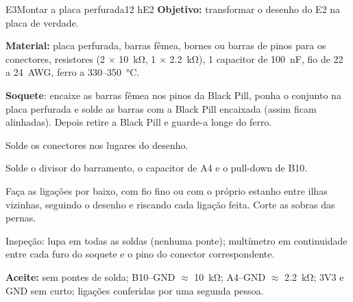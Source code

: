 \documentclass[11pt,a4paper]{article}
\newcommand{\aprox}{\ensuremath{\approx}}
\newcommand{\objetivo}[1]{{\color{azul!70!black}\textbf{Objetivo:} #1}\par\smallskip}
\begin{document}
\begin{tarefa}[ele]{E3}{Montar a placa perfurada}{1}{2 h}{E2}
\objetivo{transformar o desenho do E2 na placa de verdade.}
\textbf{Material:} placa perfurada, barras fêmea, bornes ou barras de pinos para os
conectores, resistores (2 $\times$ \qty{10}{\kilo\ohm}, 1 $\times$ \qty{2,2}{\kilo\ohm}),
1 capacitor de \qty{100}{\nano\farad}, fio de 22 a 24~AWG, ferro a 330--350~°C.
\begin{passos}
  \item \textbf{Soquete}: encaixe as barras fêmea nos pinos da Black Pill, ponha o conjunto
    na placa perfurada e solde as barras com a Black Pill encaixada (assim ficam
    alinhadas). Depois retire a Black Pill e guarde-a longe do ferro.
  \item Solde os conectores nos lugares do desenho.
  \item Solde o divisor do barramento, o capacitor de A4 e o pull-down de B10.
  \item Faça as ligações por baixo, com fio fino ou com o próprio estanho entre ilhas
    vizinhas, seguindo o desenho e riscando cada ligação feita. Corte as sobras das pernas.
  \item Inspeção: lupa em todas as soldas (nenhuma ponte); multímetro em continuidade entre
    cada furo do soquete e o pino do conector correspondente.
\end{passos}
\textbf{Aceite:} sem pontes de solda; B10--GND \aprox{} \qty{10}{\kilo\ohm};
A4--GND \aprox{} \qty{2,2}{\kilo\ohm}; 3V3 e GND sem curto; ligações conferidas por uma
segunda pessoa.
\end{tarefa}
\end{document}

